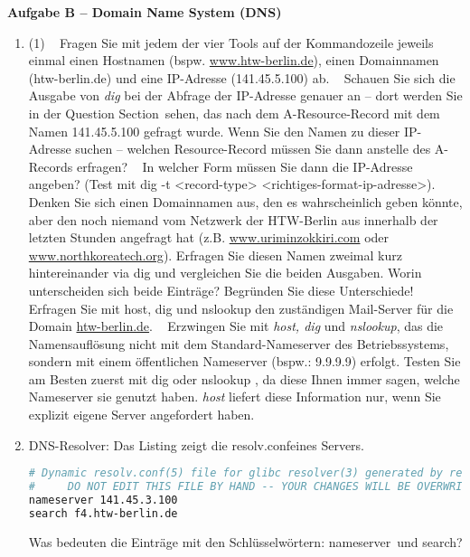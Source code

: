 \documentclass[paper=a4,fontsize=11pt]{scrartcl}%
\numberwithin{equation}{section}
\begin{document}
\begin{center}\Large{\textbf{Aufgabe B -- Domain Name System (DNS)}}\end{center}\vskip0.25in
\begin{enumerate}
	\item
\begin{tasks}(1)
		\task~ Fragen Sie mit jedem der vier Tools auf der Kommandozeile jeweils einmal einen Hostnamen (bspw. \url{www.htw-berlin.de}), einen Domainnamen (htw-berlin.de) und eine IP-Adresse (141.45.5.100) ab.
		\task~ Schauen Sie sich die Ausgabe von \emph{dig} bei der Abfrage der IP-Adresse genauer an -- dort werden Sie in der \glqq Question Section\grqq\ sehen, das nach dem A-Resource-Record mit dem Namen 141.45.5.100 gefragt wurde. Wenn Sie den Namen zu dieser IP-Adresse suchen -- welchen Resource-Record müssen Sie dann anstelle des A-Records erfragen? 
		\task~ In welcher Form müssen Sie dann die IP-Adresse angeben? (Test mit dig -t <record-type> <richtiges-format-ip-adresse>).
		\task~ Denken Sie sich einen Domainnamen aus, den es wahrscheinlich geben könnte, aber den noch niemand vom Netzwerk der HTW-Berlin aus innerhalb der letzten Stunden angefragt hat (z.B. \url{www.uriminzokkiri.com} oder \url{www.northkoreatech.org}). Erfragen Sie diesen Namen zweimal kurz hintereinander via dig und vergleichen Sie die beiden Ausgaben. Worin unterscheiden sich beide Einträge? Begründen Sie diese Unterschiede!
		\task~ Erfragen Sie mit host, dig und nslookup den zuständigen Mail-Server für die Domain \url{htw-berlin.de}.
		\task~ Erzwingen Sie mit \emph{host, dig} und \emph{nslookup}, das die Namensauflösung nicht mit dem Standard-Nameserver des Betriebssystems, sondern mit einem öffentlichen Nameserver (bspw.: 9.9.9.9) erfolgt. Testen Sie am Besten zuerst mit dig oder nslookup , da diese Ihnen immer sagen, welche Nameserver sie genutzt haben. \emph{host} liefert diese Information nur, wenn Sie explizit eigene Server angefordert haben.
	\end{tasks}
	\item DNS-Resolver: Das Listing zeigt die \glqq resolv.conf\grqq eines Servers. 
	\begin{lstlisting}[style=Bash, language=Bash]
# Dynamic resolv.conf(5) file for glibc resolver(3) generated by resolvconf(8)
#     DO NOT EDIT THIS FILE BY HAND -- YOUR CHANGES WILL BE OVERWRITTEN
nameserver 141.45.3.100
search f4.htw-berlin.de
\end{lstlisting} \label{dns}
Was bedeuten die Einträge mit den Schlüsselwörtern: \glqq nameserver\grqq\ und \glqq search\grqq ?
\end{enumerate}
\end{document}

